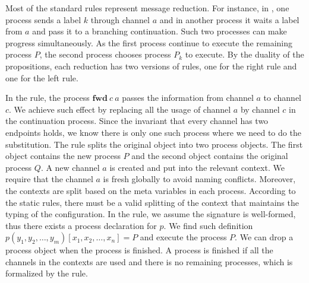 \documentclass[12pt, openany]{memoir}
\newcommand*{\fwd}[2]{\textbf{fwd}\ #1\ #2}
\begin{document}
Most of the standard rules represent message reduction. For instance,
in , one process sends a label $k$ through channel $a$ 
and in another process it waits a label from $a$ and pass it to a branching continuation.
Such two processes can make progress simultaneously. As the first process continue to execute the remaining process $P$,
the second process chooses process $P_k$ to execute. 
By the duality of the propositions, each reduction has two versions of rules, one for the right rule and one for the left rule.

In the  rule, the process $\fwd{c}{a}$ passes the information from channel $a$ to channel $c$.
We achieve such effect by replacing all the usage of channel $a$ by channel $c$ in the continuation process.
Since the invariant that every channel has two endpoints holds, we know there is only one such process where we need to do the substitution.
The  rule splits the original object into two process objects.
The first object contains the new process $P$ and the second object contains the original process $Q$.
A new channel $a$ is created and put into the relevant context. We require that the channel $a$ is fresh globally to avoid naming conflicts.
Moreover, the contexts are split based on the meta variables in each process. 
According to the static rules, there must be a valid splitting of the context that maintains the typing of the configuration.
In the  rule, we assume the signature is well-formed, thus there exists a process declaration for $p$.
We find such definition $p (y_1, y_2, \ldots, y_m) [x_1, x_2, \ldots, x_n] = P$ and execute the process $P$.
We can drop a process object when the process is finished. 
A process is finished if all the channels in the contexts are used and there is no remaining processes,
which is formalized by the  rule.
\end{document}
